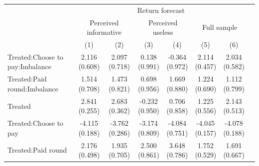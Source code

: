 \renewcommand\cellalign{t}
\begin{threeparttable}
\begin{tabular}{lccccccc}
\toprule
 & \multicolumn{6}{c}{Return forecast} \\
\cmidrule(lr){2-7} 
 & \multicolumn{2}{c}{Perceived informative} & \multicolumn{2}{c}{Perceived useless} & \multicolumn{2}{c}{Full sample} \\
\cmidrule(lr){2-3} \cmidrule(lr){4-5} \cmidrule(lr){6-7} 
 & (1) & (2) & (3) & (4) & (5) & (6) \\
\midrule
\addlinespace
Treated:Choose to pay:Imbalance & \makecell{2.116 \\ (0.608) } & \makecell{2.097 \\ (0.718) } & \makecell{0.138 \\ (0.991) } & \makecell{-0.364 \\ (0.972) } & \makecell{2.114 \\ (0.457) } & \makecell{2.034 \\ (0.582) } \\
Treated:Paid round:Imbalance & \makecell{1.514 \\ (0.708) } & \makecell{1.473 \\ (0.821) } & \makecell{0.698 \\ (0.956) } & \makecell{1.669 \\ (0.880) } & \makecell{1.224 \\ (0.690) } & \makecell{1.112 \\ (0.799) } \\
Treated & \makecell{2.841 \\ (0.255) } & \makecell{2.683 \\ (0.362) } & \makecell{-0.232 \\ (0.950) } & \makecell{0.706 \\ (0.858) } & \makecell{1.225 \\ (0.556) } & \makecell{2.143 \\ (0.513) } \\
Treated:Choose to pay & \makecell{-4.115 \\ (0.188) } & \makecell{-3.762 \\ (0.286) } & \makecell{-3.174 \\ (0.809) } & \makecell{-4.084 \\ (0.751) } & \makecell{-4.045 \\ (0.157) } & \makecell{-4.078 \\ (0.188) } \\
Treated:Paid round & \makecell{2.176 \\ (0.498) } & \makecell{1.935 \\ (0.705) } & \makecell{2.500 \\ (0.861) } & \makecell{3.648 \\ (0.786) } & \makecell{1.752 \\ (0.529) } & \makecell{1.691 \\ (0.667) } \\

\end{tabular}
\end{threeparttable}

